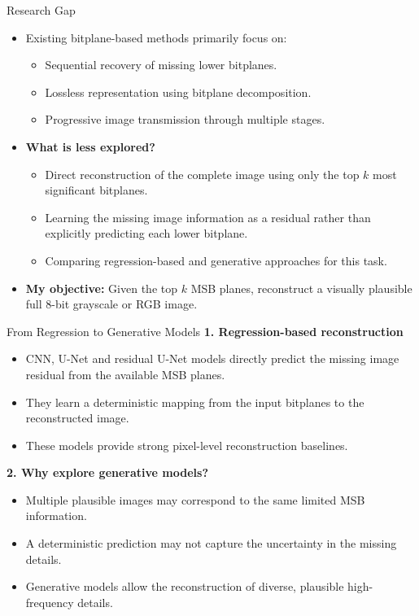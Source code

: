 \documentclass[aspectratio=169, 11pt]{beamer}
\begin{document}
\begin{frame}{Research Gap}
\small
\begin{itemize}
    \item Existing bitplane-based methods primarily focus on:
    \begin{itemize}
        \item Sequential recovery of missing lower bitplanes.
        \item Lossless representation using bitplane decomposition.
        \item Progressive image transmission through multiple stages.
    \end{itemize}

    \vspace{0.3cm}
    \item \textbf{What is less explored?}
    \begin{itemize}
        \item Direct reconstruction of the complete image using only the top $k$ most significant bitplanes.
        \item Learning the missing image information as a residual rather than explicitly predicting each lower bitplane.
        \item Comparing regression-based and generative approaches for this task.
    \end{itemize}

    \vspace{0.3cm}
    \item \textbf{My objective:} Given the top $k$ MSB planes, reconstruct a visually plausible full 8-bit grayscale or RGB image.
\end{itemize}
\end{frame}

\begin{frame}{From Regression to Generative Models}
\small
\textbf{1. Regression-based reconstruction}

\begin{itemize}
    \item CNN, U-Net and residual U-Net models directly predict the missing image residual from the available MSB planes.
    \item They learn a deterministic mapping from the input bitplanes to the reconstructed image.
    \item These models provide strong pixel-level reconstruction baselines.
\end{itemize}

\vspace{0.3cm}
\textbf{2. Why explore generative models?}

\begin{itemize}
    \item Multiple plausible images may correspond to the same limited MSB information.
    \item A deterministic prediction may not capture the uncertainty in the missing details.
    \item Generative models allow the reconstruction of diverse, plausible high-frequency details.
\end{itemize}
\end{frame}
\end{document}
